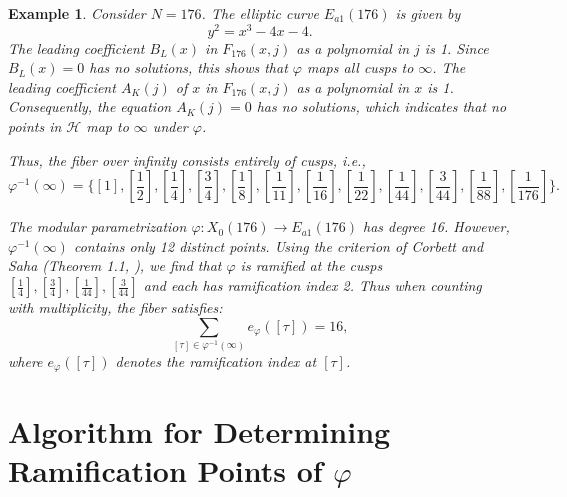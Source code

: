 \documentclass[10pt, a4paper]{article}
\newtheorem{example}[theorem]{Example}
\begin{document}
\begin{example}
Consider $N = 176$. The elliptic curve $E_{a1}(176)$ is given by
\[ y^2 = x^3 - 4x - 4. \]
The leading coefficient $B_L(x)$  in $F_{176}(x,j)$  as a polynomial in $j$ is 1.
Since $B_L(x) = 0$ has no solutions, this shows that $\varphi$ maps all cusps to $\infty$.
The leading coefficient $A_K(j)$ of $x$  in  $F_{176}(x,j)$  as a polynomial in $x$  is 1. Consequently, the equation $A_K(j) = 0$ has no solutions, which indicates that no points in $\mathcal{H}$ map to $\infty$ under $\varphi$.

Thus, the fiber over infinity consists entirely of cusps, i.e.,
\[
\varphi^{-1}(\infty) =\{[1], [\frac{1}{2}], [\frac{1}{4}], [\frac{3}{4}], [\frac{1}{8}], [\frac{1}{11}], [\frac{1}{16}], [\frac{1}{22}], [\frac{1}{44}], [\frac{3}{44}], [\frac{1}{88}], [\frac{1}{176}] \}.
\]

The modular parametrization $\varphi: X_0(176) \to E_{a1}(176)$ has degree 16.
However, $\varphi^{-1}(\infty)$ contains only 12 distinct points.
 Using the criterion of Corbett and Saha (Theorem 1.1, \cite{Corbett-Saha}), we find that $\varphi$ is ramified at the cusps $\left[\frac{1}{4}\right], \left[\frac{3}{4}\right], \left[\frac{1}{44}\right], \left[\frac{3}{44}\right]$ and
each has ramification index 2. Thus when counting with multiplicity, the fiber satisfies:
\[
\sum_{[\tau] \in \varphi^{-1}(\infty)} e_\varphi([\tau]) = 16,
\]
where $e_\varphi([\tau])$ denotes the ramification index at $[\tau]$.
\end{example}
\section{Algorithm for Determining Ramification Points of $\varphi$}
\end{document}
